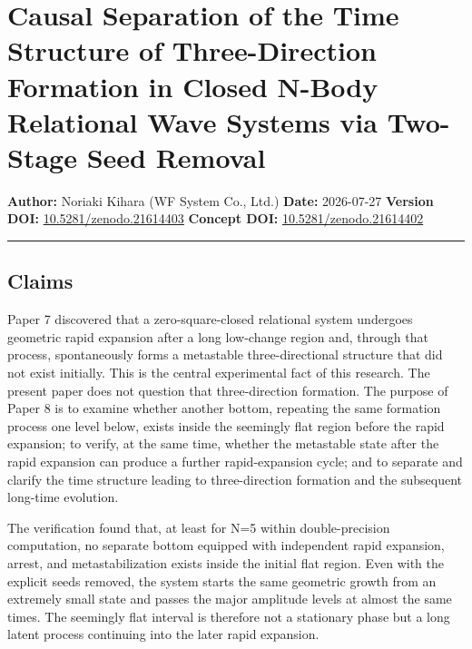 \documentclass[
  a4paper,
]{article}
\author{}
\date{}
\begin{document}
\section{Causal Separation of the Time Structure of Three-Direction
Formation in Closed N-Body Relational Wave Systems via Two-Stage Seed
Removal}\label{causal-separation-of-the-time-structure-of-three-direction-formation-in-closed-n-body-relational-wave-systems-via-two-stage-seed-removal}

\textbf{Author:} Noriaki Kihara (WF System Co., Ltd.) \textbf{Date:}
2026-07-27 \textbf{Version DOI:}
\href{https://doi.org/10.5281/zenodo.21614403}{10.5281/zenodo.21614403}
\textbf{Concept DOI:}
\href{https://doi.org/10.5281/zenodo.21614402}{10.5281/zenodo.21614402}

\begin{center}\rule{0.5\linewidth}{0.5pt}\end{center}

\subsection{Claims}\label{claims}

Paper 7 discovered that a zero-square-closed relational system undergoes
geometric rapid expansion after a long low-change region and, through
that process, spontaneously forms a metastable three-directional
structure that did not exist initially. This is the central experimental
fact of this research. The present paper does not question that
three-direction formation. The purpose of Paper 8 is to examine whether
another bottom, repeating the same formation process one level below,
exists inside the seemingly flat region before the rapid expansion; to
verify, at the same time, whether the metastable state after the rapid
expansion can produce a further rapid-expansion cycle; and to separate
and clarify the time structure leading to three-direction formation and
the subsequent long-time evolution.

The verification found that, at least for N=5 within double-precision
computation, no separate bottom equipped with independent rapid
expansion, arrest, and metastabilization exists inside the initial flat
region. Even with the explicit seeds removed, the system starts the same
geometric growth from an extremely small state and passes the major
amplitude levels at almost the same times. The seemingly flat interval
is therefore not a stationary phase but a long latent process continuing
into the later rapid expansion.
\end{document}

